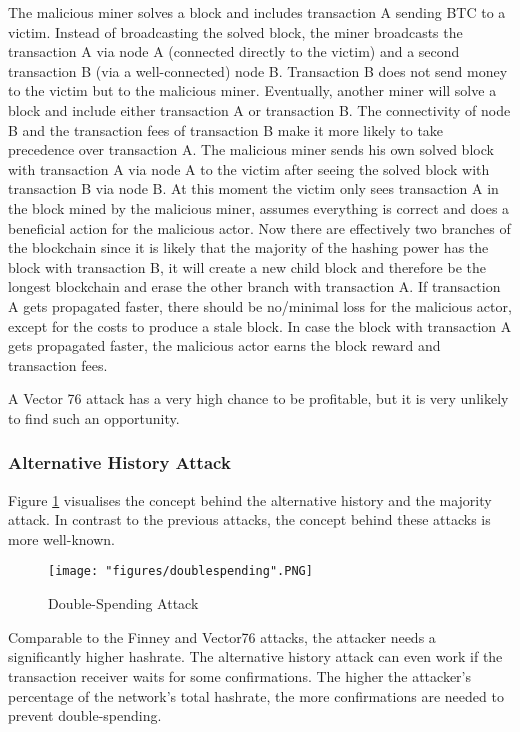 The malicious miner solves a block and includes transaction A sending BTC to a victim. Instead of broadcasting the solved block, the miner broadcasts the transaction A via node A (connected directly to the victim) and a second transaction B (via a well-connected) node B. Transaction B does not send money to the victim but to the malicious miner. Eventually, another miner will solve a block and include either transaction A or transaction B. The connectivity of node B and the transaction fees of transaction B make it more likely to take precedence over transaction A. The malicious miner sends his own solved block with transaction A via node A to the victim after seeing the solved block with transaction B via node B. At this moment the victim only sees transaction A in the block mined by the malicious miner, assumes everything is correct and does a beneficial action for the malicious actor. Now there are effectively two branches of the blockchain since it is likely that the majority of the hashing power has the block with transaction B, it will create a new child block and therefore be the longest blockchain and erase the other branch with transaction A. If transaction A gets propagated faster, there should be no/minimal loss for the malicious actor, except for the costs to produce a stale block. In case the block with transaction A gets propagated faster, the malicious actor earns the block reward and transaction fees.

A Vector 76 attack has a very high chance to be profitable, but it is very unlikely to find such an opportunity.

\subsubsection{Alternative History Attack\label{subsubsection:alternativeHistoryAttack}}
Figure \ref{fig:doublespending} visualises the concept behind the alternative history and the majority attack. In contrast to the previous attacks, the concept behind these attacks is more well-known.

\begin{figure}[!htb]
\texttt{[image: "figures/doublespending".PNG]}
\caption{Double-Spending Attack \cite{doublespending2} \label{fig:doublespending}}
\end{figure}

Comparable to the Finney and Vector76 attacks, the attacker needs a significantly higher hashrate. The alternative history attack can even work if the transaction receiver waits for some confirmations. The higher the attacker's percentage of the network's total hashrate, the more confirmations are needed to prevent double-spending.

